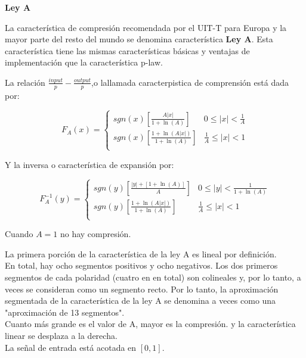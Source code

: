 \begin{center}
	\LARGE\bfseries Ley A
\end{center}

La característica de compresión recomendada por el UIT-T para Europa y la mayor parte del
resto del mundo se denomina característica  \textbf{Ley A}. Esta característica tiene las mismas
características básicas y ventajas de implementación que la característica p-law.

La relación $\frac{input}{p} -\frac{output}{p}$,o lallamada caracterpistica de comprensión está dada por:


\begin{equation}
	F_A(x)= \left\lbrace \begin{array}{ll}
			sgn(x)\left[ \frac{A|x|}{1+\ln(A)}\right] & 0 \leq |x| < \frac{1}{A}\\
			 	sgn(x)\left[ \frac{1+ \ln(A|x|)}{1+\ln(A)}\right] &  \frac{1}{A} \leq |x| < 1\\
		\end{array}
	\right.
\end{equation}


Y la inversa o característica de expansión por:

\begin{equation}
	F^{-1}_A(y)= \left\lbrace \begin{array}{ll}
		sgn(y)\left[ \frac{|y|+[1+\ln(A)]}{A}\right] & 0 \leq |y| < \frac{1}{1+\ln(A)}\\
		sgn(y)\left[ \frac{1+ \ln(A|x|)}{1+\ln(A)}\right] &  \frac{1}{A} \leq |x| < 1\\
	\end{array}
	\right.
\end{equation}

Cuando $A=1$ no hay compresión.

 La primera porción de la característica de la ley A es lineal por definición. \\
 
 En total, hay ocho
 segmentos positivos y ocho negativos. Los dos primeros segmentos de cada polaridad (cuatro en
 en total) son colineales y, por lo tanto, a veces se consideran como un segmento recto.
 Por lo tanto, la aproximación segmentada de la característica de la ley A se denomina a veces
 como una "aproximación de 13 segmentos". \\
 
 Cuanto más grande es el valor de A, mayor es la compresión. y la característica linear se desplaza a la derecha. \\
 
 La señal de entrada está acotada en $[0,1]$.
 
 \begin{figure}[!htbp]
 \end{figure}
 
 

